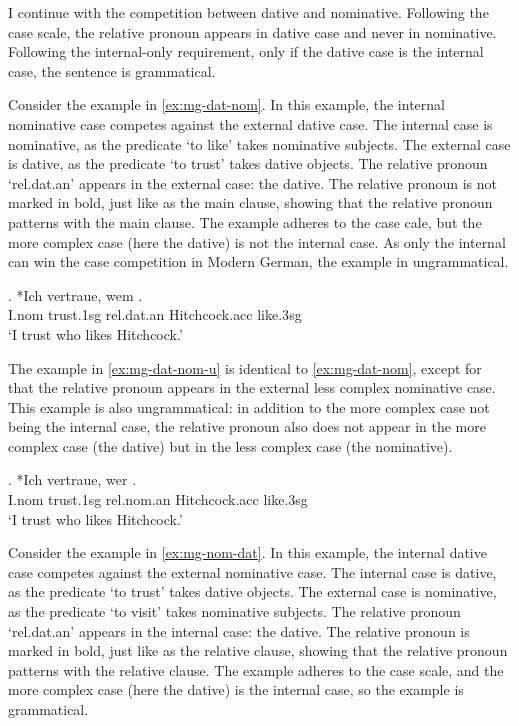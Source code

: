 I continue with the competition between dative and nominative. Following the case scale, the relative pronoun appears in dative case and never in nominative. Following the internal-only requirement, only if the dative case is the internal case, the sentence is grammatical.

Consider the example in \ref{ex:mg-dat-nom}. In this example, the internal nominative case competes against the external dative case.
The internal case is nominative, as the predicate  `to like' takes nominative subjects.
The external case is dative, as the predicate  `to trust' takes dative objects.
The relative pronoun  `\ac{rel}.\ac{dat}.\ac{an}' appears in the external case: the dative. The relative pronoun is not marked in bold, just like as the main clause, showing that the relative pronoun patterns with the main clause.
The example adheres to the case cale, but the more complex case (here the dative) is not the internal case. As only the internal can win the case competition in Modern German, the example in ungrammatical.

\exg. *Ich vertraue, wem  .\\
I.\ac{nom} trust.1\ac{sg}\scsub{[dat]} \ac{rel}.\ac{dat}.\ac{an} Hitchcock.\ac{acc} like.3\ac{sg}\scsub{[nom]}\\
`I trust who likes Hitchcock.' \label{ex:mg-dat-nom}

The example in \ref{ex:mg-dat-nom-u} is identical to \ref{ex:mg-dat-nom}, except for that the relative pronoun appears in the external less complex nominative case. This example is also ungrammatical: in addition to the more complex case not being the internal case, the relative pronoun also does not appear in the more complex case (the dative) but in the less complex case (the nominative).

\exg. *Ich vertraue, wer  .\\
I.\ac{nom} trust.1\ac{sg}\scsub{[dat]} \ac{rel}.\ac{nom}.\ac{an} Hitchcock.\ac{acc} like.3\ac{sg}\scsub{[nom]}\\
`I trust who likes Hitchcock.' \label{ex:mg-dat-nom-u}

Consider the example in \ref{ex:mg-nom-dat}. In this example, the internal dative case competes against the external nominative case.
The internal case is dative, as the predicate  `to trust' takes dative objects.
The external case is nominative, as the predicate  `to visit' takes nominative subjects.
The relative pronoun  `\ac{rel}.\ac{dat}.\ac{an}' appears in the internal case: the dative. The relative pronoun is marked in bold, just like as the relative clause, showing that the relative pronoun patterns with the relative clause.
The example adheres to the case scale, and the more complex case (here the dative) is the internal case, so the example is grammatical.

